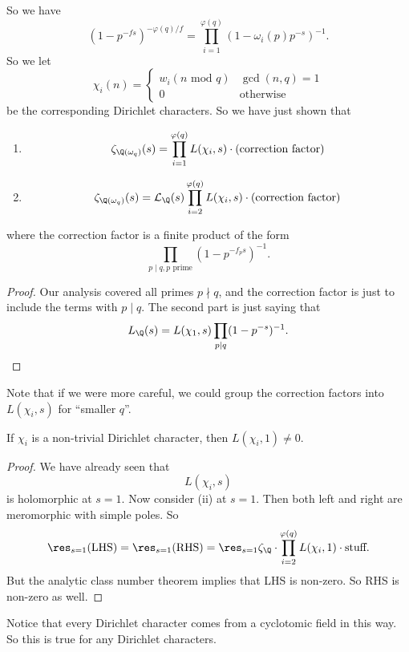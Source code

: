 \documentclass[a4paper]{article}
\begin{document}
So we have
\[
  (1 - p^{-fs})^{-\varphi(q)/f} = \prod_{i = 1}^{\varphi(q)}(1 - \omega_i(p) p^{-s})^{-1}.
\]
So we let
\[
  \chi_i(n) =
  \begin{cases}
    w_i(n\text{ mod }q) & \gcd(n, q) = 1\\
    0 & \text{otherwise}
  \end{cases}
\]
be the corresponding Dirichlet characters. So we have just shown that
\begin{prop}\leavevmode
  \begin{enumerate}
    \item
      \[
        \zeta_{\Q(\omega_q)}(s) = \prod_{i = 1}^{\varphi(q)} L(\chi_i, s) \cdot (\text{correction factor})
      \]
    \item
      \[
        \zeta_{\Q(\omega_q)}(s) = \mathcal{L}_\Q(s) \prod_{i = 2}^{\varphi(q)} L(\chi_i, s) \cdot (\text{correction factor})
      \]
  \end{enumerate}
  where the correction factor is a finite product of the form
  \[
    \prod_{p \mid q, p\text{ prime}} (1 - p^{-f_p s})^{-1}.
  \]
\end{prop}

\begin{proof}
  Our analysis covered all primes $p \nmid q$, and the correction factor is just to include the terms with $p \mid q$. The second part is just saying that
  \[
    L_\Q(s) = L(\chi_1, s) \prod_{p \mid q}(1 - p^{-s})^{-1}.
  \]
\end{proof}
Note that if we were more careful, we could group the correction factors into $L(\chi_i, s)$ for ``smaller $q$''.

\begin{cor}
  If $\chi_i$ is a non-trivial Dirichlet character, then $L(\chi_i, 1) \not= 0$.
\end{cor}

\begin{proof}
  We have already seen that
  \[
    L(\chi_i, s)
  \]
  is holomorphic at $s = 1$. Now consider (ii) at $s = 1$. Then both left and right are meromorphic with simple poles. So
  \[
    \res_{s = 1}(\text{LHS}) = \res_{s = 1}(\text{RHS}) = \res_{s = 1}\zeta_\Q \cdot \prod_{i = 2}^{\varphi(q)}L(\chi_i, 1) \cdot \text{stuff}.
  \]
  But the analytic class number theorem implies that LHS is non-zero. So RHS is non-zero as well.
\end{proof}

Notice that every Dirichlet character comes from a cyclotomic field in this way. So this is true for any Dirichlet characters.
\end{document}
